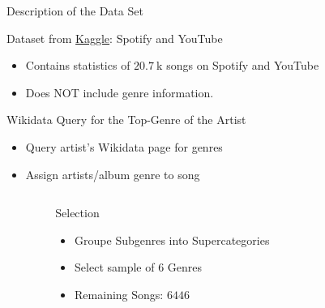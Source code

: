 \begin{frame}{Description of the Data Set}
    \begin{alertblock}{Dataset from \href{https://www.kaggle.com/datasets/salvatorerastelli/spotify-and-youtube}{Kaggle}: Spotify and YouTube}
      \begin{itemize}
        \item Contains statistics of $\SI{20.7}{\kilo}$ songs on Spotify and YouTube
        \item Does \alert{NOT} include genre information.
      \end{itemize}
    \end{alertblock}
    \begin{alertblock}{Wikidata Query for the Top-Genre of the Artist}
      \begin{itemize}
       \item Query artist’s Wikidata page for genres
       \item Assign artists/album genre to song
      \end{itemize}
    \end{alertblock}
    \vspace*{-0.5cm}
    \begin{columns}[t]
        \begin{column}{0.1\textwidth}
        \end{column}
        \begin{column}{0.3\textwidth}
            \begin{alertblock}{Selection}
                \begin{itemize}
                    \item Groupe Subgenres into Supercategories
                    \item Select sample of $\num{6}$ Genres
                    \item Remaining Songs: $\num{6446}$
                \end{itemize}
            \end{alertblock}
        \end{column}
        \begin{column}{0.7\textwidth}
            \begin{figure}

\end{figure}
\end{column}
\end{columns}
\end{frame}
